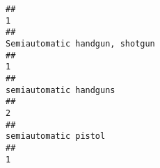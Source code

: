 \documentclass[
]{article}
\begin{document}
\begin{verbatim}
##                                                                                                                                                                                                                                                                                                                                                                                                     1 
##                                                                                                                                                                                                                                                                                                                                                                        Semiautomatic handgun, shotgun 
##                                                                                                                                                                                                                                                                                                                                                                                                     1 
##                                                                                                                                                                                                                                                                                                                                                                                semiautomatic handguns 
##                                                                                                                                                                                                                                                                                                                                                                                                     2 
##                                                                                                                                                                                                                                                                                                                                                                                  semiautomatic pistol 
##                                                                                                                                                                                                                                                                                                                                                                                                     1 

\end{verbatim}
\end{document}
